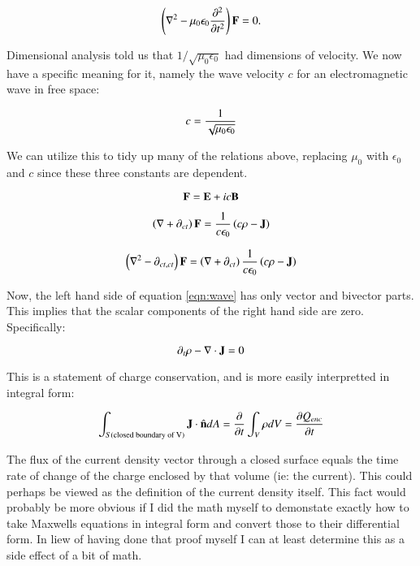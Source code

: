 \documentclass{article}      %
\newcommand{\grad}[0]{\nabla}
\begin{document}
\begin{equation}
\left(\grad^2 - \mu_0\epsilon_0 \frac{\partial^2}{\partial t^2} \right) \BF = 0.
\end{equation}

Dimensional analysis told us that $1/{\sqrt{\mu_0\epsilon_0}}$ had dimensions of velocity.  We now have a specific meaning for it, namely the
wave velocity $c$ for an electromagnetic wave in free space:

\begin{equation}
c = \frac{1}{\sqrt{\mu_0\epsilon_0}}
\end{equation}

We can utilize this to tidy up many of the relations above, replacing $\mu_0$ with $\epsilon_0$ and $c$ since these three constants are dependent.

\begin{equation}
\mathbf{F} = \mathbf{E} + i c \mathbf{B}
\end{equation}

\begin{equation}
\left(\grad + \partial_{ct}\right) \BF =
\inv{c \epsilon_0}\left( c \rho - \BJ \right)
\end{equation}

\begin{equation} \label{eqn:wave}
\left(\grad^2 - \partial_{ct, ct}\right) \BF =
\left(\grad + \partial_{c t}\right) \inv{c \epsilon_0}\left( c \rho - \BJ \right)
\end{equation}

Now, the left hand side of equation \ref{eqn:wave} has only vector and bivector parts.  This implies that the scalar components of the right hand side are zero.  Specifically:

\begin{equation*}
\partial_t \rho - \grad \cdot \BJ = 0
\end{equation*}

This is a statement of charge conservation, and is more easily interpretted in integral form:

\begin{equation}
\int_{S(\text{closed boundary of V})} \mathbf{J} \cdot \hat{\mathbf{n}} dA = \frac{\partial}{\partial t} \int_V \rho dV = \frac{\partial Q_{enc}}{\partial t}
\end{equation}

The flux of the current density vector through a closed surface equals the time rate of change of the charge enclosed by that volume (ie: the current).  This could perhaps be viewed as the definition of the current density itself.  This fact would probably be more obvious if I did the math myself to demonstate exactly how to take Maxwells equations in integral form and convert those to their differential form.  In liew of having done that proof myself I can at least determine this as a side effect of a bit of math.
\end{document}
